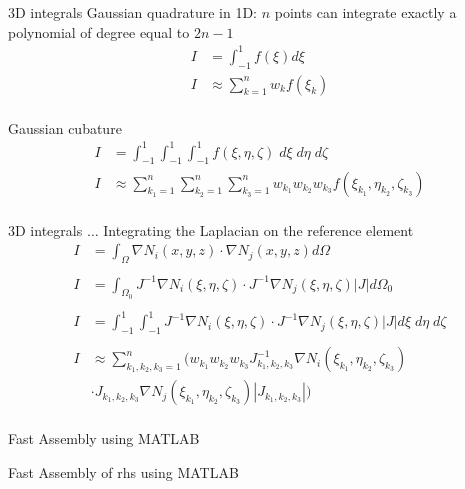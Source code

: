 \documentclass[handout]{beamer}
{
\usepackage{fullpage}
\usepackage{hyperref}
\usepackage{amssymb} 
}
\begin{document}
\begin{frame}{3D integrals}
Gaussian quadrature in 1D: $n$ points can integrate exactly a polynomial
of degree equal to $2 n - 1$
\begin{align*}
I &= \int_{-1}^1 f(\xi) d \xi  \\
I &\approx \sum_{k=1}^n w_k f(\xi_k) \\
\end{align*}


Gaussian cubature
\begin{align*}
I &= \int_{-1}^1 \int_{-1}^1 \int_{-1}^1 f(\xi, \eta, \zeta) \; d \xi \; d \eta \; d  \zeta \\
I &\approx \sum_{k_1=1}^n \sum_{k_2=1}^n \sum_{k_3=1}^n w_{k_1} w_{k_2} w_{k_3} f(\xi_{k_1}, \eta_{k_2}, \zeta_{k_3}) \\
\end{align*}

\end{frame}

\begin{frame}{3D integrals $\ldots$}
Integrating the Laplacian on the reference element
\begin{align*}
I &= \int_{\Omega} \nabla N_i(x,y,z) \cdot \nabla N_j(x,y,z) d \Omega \\ \\
I &= \int_{\Omega_0} J^{-1} \nabla N_i (\xi, \eta, \zeta) \cdot J^{-1}\nabla N_j (\xi, \eta, \zeta) |J| d \Omega_0 \\ \\
I &= \int_{-1}^1 \int_{-1}^1 J^{-1} \nabla N_i(\xi, \eta, \zeta) \cdot J^{-1}\nabla N_j(\xi, \eta, \zeta) |J| d \xi \; d \eta \; d \zeta\\ \\
I &\approx  \sum_{k_1,k_2,k_3=1}^n  ( w_{k_1} w_{k_2} w_{k_3} J^{-1}_{k_1,k_2,k_3} \nabla N_i(\xi_{k_1}, \eta_{k_2}, \zeta_{k_3}) 
\\ & \cdot J_{k_1,k_2,k_3} \nabla N_j(\xi_{k_1}, \eta_{k_2}, \zeta_{k_3}) |J_{k_1,k_2,k_3}| ) \\
\end{align*}

\end{frame}


\begin{frame}{Fast Assembly using MATLAB}

\end{frame}

\begin{frame}{Fast Assembly of rhs using MATLAB}

\end{frame}
\end{document}
